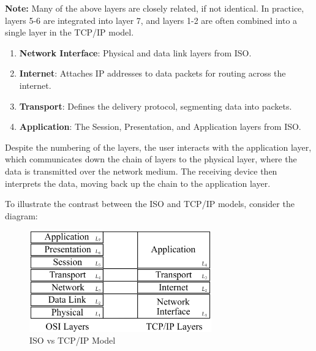 \begin{Note}
    \textbf{Note:} Many of the above layers are closely related, if not identical. 
    In practice, layers 5-6 are integrated into layer 7, and 
    layers 1-2 are often combined into a single layer in the TCP/IP model.
    
\end{Note}


\begin{Def}

    \begin{enumerate}
        \item \textbf{Network Interface}: Physical and data link layers from ISO. 
        \item \textbf{Internet}: Attaches IP addresses to data packets for routing across the internet.
        \item \textbf{Transport}: Defines the delivery protocol, segmenting data into packets.
        \item \textbf{Application}: The Session, Presentation, and Application layers from ISO.
    \end{enumerate}
    \hfill \cite{Rayes2022}
\end{Def}

Despite the numbering of the layers, the user interacts with the application layer, which communicates down the chain
of layers to the physical layer, where the data is transmitted over the network medium. The receiving device then 
interprets the data, moving back up the chain to the application layer.

\newpage 

\noindent
To illustrate the contrast between the ISO and TCP/IP models, consider the diagram:
\begin{figure}[h!]
    \centering
    \includegraphics[width=0.7\textwidth]{Sections/network/osi_tcp.png}
    \caption{ISO vs TCP/IP Model}
    \label{fig:osi_tcpip}
\end{figure}

